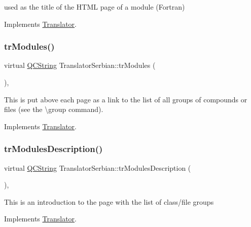 used as the title of the H\+T\+ML page of a module (Fortran) 

Implements \mbox{\hyperlink{class_translator}{Translator}}.

\mbox{\label{class_translator_serbian_a1343b67e7a93ee55141aff69a347d26e}} 
\subsubsection{\texorpdfstring{trModules()}{trModules()}}
{\footnotesize\ttfamily virtual \mbox{\hyperlink{class_q_c_string}{Q\+C\+String}} Translator\+Serbian\+::tr\+Modules (\begin{DoxyParamCaption}{ }\end{DoxyParamCaption})\hspace{0.3cm}{\ttfamily [inline]}, {\ttfamily [virtual]}}

This is put above each page as a link to the list of all groups of compounds or files (see the \textbackslash{}group command). 

Implements \mbox{\hyperlink{class_translator}{Translator}}.

\mbox{\label{class_translator_serbian_ac31c9ab7c50ba086294245dc85d1e09b}} 
\subsubsection{\texorpdfstring{trModulesDescription()}{trModulesDescription()}}
{\footnotesize\ttfamily virtual \mbox{\hyperlink{class_q_c_string}{Q\+C\+String}} Translator\+Serbian\+::tr\+Modules\+Description (\begin{DoxyParamCaption}{ }\end{DoxyParamCaption})\hspace{0.3cm}{\ttfamily [inline]}, {\ttfamily [virtual]}}

This is an introduction to the page with the list of class/file groups 

Implements \mbox{\hyperlink{class_translator}{Translator}}.

\mbox{\label{class_translator_serbian_a7198887f50b807e38f755814be867d1b}} 
